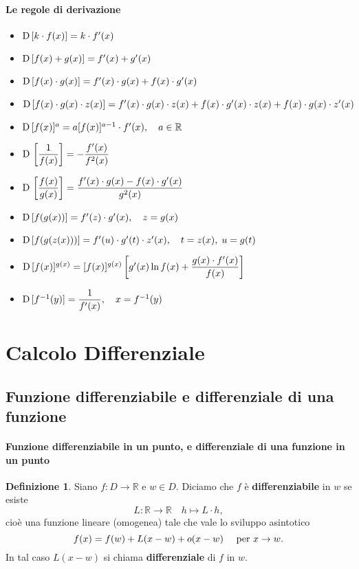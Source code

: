 \documentclass{article}
\theoremstyle{plain}
\theoremstyle{definition}
\newtheorem{defn}{Definizione}[section]
\theoremstyle{remark}
\begin{document}
\paragraph{Le regole di derivazione}
\begin{itemize}
    \item[] $\textup{D}\,[k\cdot f(x)]=k\cdot f'(x)$
    \item[] $\textup{D}\,[f(x)+g(x)]=f'(x)+g'(x)$
    \item[] $\textup{D}\,[f(x)\cdot g(x)]=f'(x)\cdot g(x)+f(x)\cdot g'(x)$
    \item[] $\textup{D}\,[f(x)\cdot g(x)\cdot z(x)]=f'(x)\cdot g(x)\cdot z(x)+f(x)\cdot g'(x)\cdot z(x)+f(x)\cdot g(x)\cdot z'(x)$
    \item[] $\textup{D}\,[f(x)]^a=a[f(x)]^{a-1}\cdot f'(x),\quad a\in\mathbb{R}$
    \item[] $\textup{D}\,\left[\dfrac{1}{f(x)}\right]=-\dfrac{f'(x)}{f^2(x)}$
    \item[] $\textup{D}\,\left[\dfrac{f(x)}{g(x)}\right]=\dfrac{f'(x)\cdot g(x)-f(x)\cdot g'(x)}{g^2(x)}$
    \item[] $\textup{D}\,[f(g(x))]=f'(z)\cdot g'(x),\quad z=g(x)$
    \item[] $\textup{D}\,[f(g(z(x)))]=f'(u)\cdot g'(t)\cdot z'(x),\quad t=z(x),\; u=g(t)$
    \item[] $\textup{D}\,[f(x)]^{g(x)}=[f(x)]^{g(x)}\left[g'(x)\ln f(x)+\dfrac{g(x)\cdot f'(x)}{f(x)}\right]$
    \item[] $\textup{D}\,[f^{-1}(y)]=\dfrac{1}{f'(x)},\quad x=f^{-1}(y)$
\end{itemize}

\vspace{50pt} 

\vspace{50pt}
\section{Calcolo Differenziale}
\vspace{50pt}

\subsection{Funzione differenziabile e differenziale di una funzione}

\vspace{10pt}

\paragraph{Funzione differenziabile in un punto, e differenziale di una funzione in un punto}
\begin{bxthm}
\begin{defn}
    Siano $f:D\to\mathbb{R}$ e $w\in D$.
    Diciamo che $f$ è \textbf{differenziabile} in $w$ se esiste
    \[ L:\mathbb{R}\to\mathbb{R}\quad h\mapsto L\cdot h, \]
    cioè una funzione lineare (omogenea) tale che vale lo sviluppo asintotico
    \[f(x)=f(w)+L(x-w)+o(x-w)\quad\textup{ per }x\to w.\]
    In tal caso $L(x-w)$ si chiama \textbf{differenziale} di $f$ in $w$.
\end{defn}
\end{bxthm}
\end{document}
